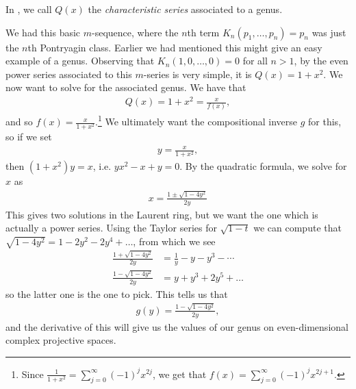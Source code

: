 \documentclass[11pt]{book}
\begin{document}
\begin{terminology} In , we call $Q(x)$ the \emph{characteristic series} associated to a genus.
\end{terminology}

\begin{example} We had this basic $m$-sequence, where the $n$th term $K_n(p_1, \ldots, p_n) = p_n$ was just the $n$th Pontryagin class. Earlier we had mentioned this might give an easy example of a genus. Observing that $K_n(1,0, \ldots, 0) = 0$ for all $n>1$, by  the even power series associated to this $m$-series is very simple, it is $Q(x) = 1 + x^2$. We now want to solve for the associated genus. We have that
\begin{align*}
    Q(x) = 1 + x^2 = \frac{x}{f(x)},
\end{align*}
and so $f(x) = \frac{x}{1+x^2}$.\footnote{Since $\frac{1}{1+x^2} = \sum_{j=0}^\infty (-1)^j x^{2j}$, we get that $f(x) = \sum_{j=0}^\infty (-1)^j x^{2j+1}$.} We ultimately want the compositional inverse $g$ for this, so if we set
\begin{align*}
    y = \frac{x}{1+x^2},
\end{align*}
then $(1+x^2)y = x$, i.e. $yx^2 - x + y = 0$. By the quadratic formula, we solve for $x$ as
\begin{align*}
    x = \frac{1 \pm \sqrt{1 - 4y^2}}{2y}
\end{align*}
This gives two solutions in the Laurent ring, but we want the one which is actually a power series. Using the Taylor series for $\sqrt{1-t}$ we can compute that $\sqrt{1 - 4y^2} = 1 - 2y^2 -2y^4 + \ldots$, from which we see
\begin{align*}
    \frac{1 + \sqrt{1-4y^2}}{2y} &= \frac{1}{y} - y - y^3 - \cdots \\
    \frac{1 - \sqrt{1-4y^2}}{2y} &= y + y^3 + 2y^5 + \ldots
\end{align*}
so the latter one is the one to pick. This tells us that
\begin{align*}
    g(y) = \frac{1 - \sqrt{1-4y^2}}{2y},
\end{align*}
and the derivative of this will give us the values of our genus on even-dimensional complex projective spaces.


\end{example}
\end{document}
